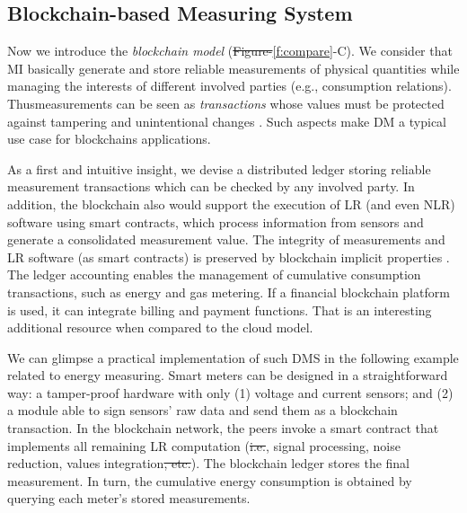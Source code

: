 \documentclass[journal]{IEEEtran} %
\providecommand{\DIFadd}[1]{{\protect\color{blue}\uwave{#1}}} %
\providecommand{\DIFdel}[1]{{\protect\color{red}\sout{#1}}}                      %
\providecommand{\DIFaddbegin}{} %
\providecommand{\DIFaddend}{} %
\providecommand{\DIFdelbegin}{} %
\providecommand{\DIFdelend}{} %
\begin{document}
\subsection{Blockchain-based Measuring System}
\label{s:mi_blockchain}
Now we introduce the \emph{blockchain model} (\DIFdelbegin \DIFdel{Figure-}\DIFdelend \DIFaddbegin \DIFadd{Figure~}\DIFaddend \ref{f:compare}-C). 
We consider that MI basically generate and store reliable measurements of physical quantities while managing the interests of different involved parties (e.g., consumption relations). 
Thus\DIFaddbegin \DIFadd{, }\DIFaddend measurements can be seen as \emph{transactions} whose values must be protected against tampering and unintentional changes \cite{Esche2015}. Such aspects make DM a typical use case for blockchains applications. 

As a first and intuitive insight, we devise a distributed ledger storing reliable measurement transactions which can be checked by any involved party. 
In addition, the blockchain also would support the execution of LR (and even NLR) software using smart contracts, which process information from sensors and generate a consolidated measurement value. 
The integrity of measurements and LR software (as smart contracts) is preserved by blockchain implicit properties \cite{Zheng2017}. 
The ledger accounting enables the management of cumulative consumption transactions, such as energy and gas metering. If a financial blockchain platform is used, it can integrate billing and payment functions. 
That is an interesting additional resource when compared to the cloud model.

We can glimpse a practical implementation of such DMS in the following example related to energy measuring. 
Smart meters can be designed in a straightforward way: a tamper-proof hardware with only (1) voltage and current sensors; and (2) a module able to sign sensors' raw data and send them as a blockchain transaction. 
In the blockchain network, the peers invoke a smart contract that implements all remaining LR computation (\DIFdelbegin \DIFdel{i.e.}\DIFdelend \DIFaddbegin \DIFadd{e.g.}\DIFaddend , signal processing, noise reduction, values integration\DIFdelbegin \DIFdel{, etc.}\DIFdelend ). 
The blockchain ledger stores the final measurement. 
In turn, the cumulative energy consumption is obtained by querying each meter's stored measurements.
\end{document}
